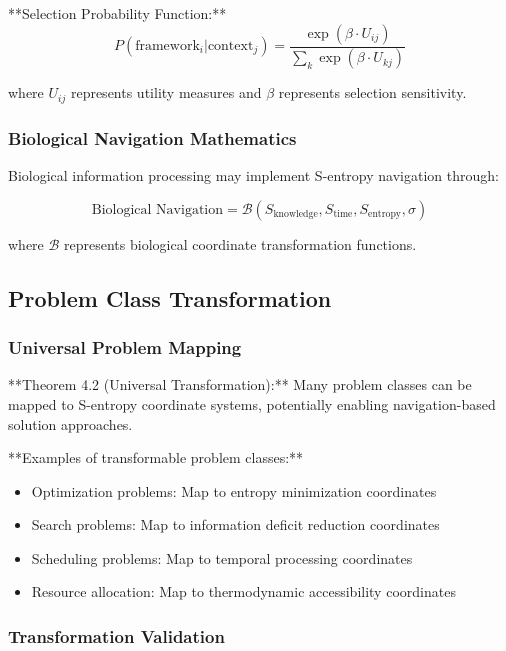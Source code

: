 \documentclass[11pt]{article}
\begin{document}
**Selection Probability Function:**
\begin{equation}
P(\text{framework}_i | \text{context}_j) = \frac{\exp(\beta \cdot U_{ij})}{\sum_k \exp(\beta \cdot U_{kj})}
\label{eq:framework_selection}
\end{equation}

where $U_{ij}$ represents utility measures and $\beta$ represents selection sensitivity.

\subsubsection{Biological Navigation Mathematics}

Biological information processing may implement S-entropy navigation through:

\begin{equation}
\text{Biological Navigation} = \mathcal{B}(S_{\text{knowledge}}, S_{\text{time}}, S_{\text{entropy}}, \sigma)
\label{eq:biological_navigation}
\end{equation}

where $\mathcal{B}$ represents biological coordinate transformation functions.

\subsection{Problem Class Transformation}

\subsubsection{Universal Problem Mapping}

**Theorem 4.2 (Universal Transformation):** Many problem classes can be mapped to S-entropy coordinate systems, potentially enabling navigation-based solution approaches.

**Examples of transformable problem classes:**
\begin{itemize}
\item Optimization problems: Map to entropy minimization coordinates
\item Search problems: Map to information deficit reduction coordinates
\item Scheduling problems: Map to temporal processing coordinates
\item Resource allocation: Map to thermodynamic accessibility coordinates
\end{itemize}

\subsubsection{Transformation Validation}
\end{document}
